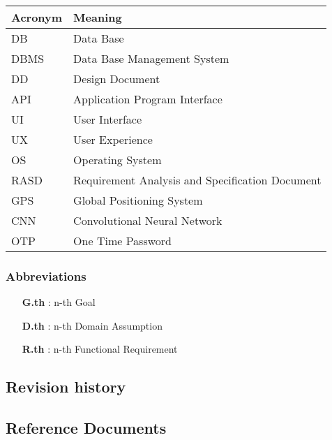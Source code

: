 \begin{tabular}{|l|l|}
\hline
Acronym & Meaning \\ \hline
DB & Data Base \\ \hline
DBMS & Data Base Management System \\ \hline
DD & Design Document \\ \hline
API & Application Program Interface \\ \hline
UI & User Interface \\ \hline
UX & User Experience \\ \hline
OS & Operating System \\ \hline
RASD & Requirement Analysis and Specification Document \\ \hline
GPS & Global Positioning System \\ \hline
CNN & Convolutional Neural Network \\ \hline
OTP & One Time Password \\ 
\hline


\end{tabular}

\subsubsection{Abbreviations}

\begin{itemize}

\item [\textbf{G.th}]: n-th Goal

\item [\textbf{D.th}]: n-th Domain Assumption

\item [\textbf{R.th}]: n-th Functional Requirement

\end{itemize}


\subsection{Revision history}


\subsection{Reference Documents}

